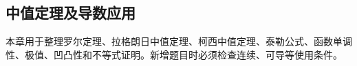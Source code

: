 \subsection{中值定理及导数应用}

\begin{knowledgeBox}
本章用于整理罗尔定理、拉格朗日中值定理、柯西中值定理、泰勒公式、函数单调性、极值、凹凸性和不等式证明。新增题目时必须检查连续、可导等使用条件。
\end{knowledgeBox}
